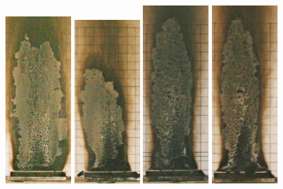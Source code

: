\documentclass[twoside]{uocthesis}
\begin{document}
{\begin{figure}[p]
	\includegraphics[width=1.0in]{../Figures/GBGAS_23_IMG_6048}
	\includegraphics[width=1.0in]{../Figures/GBGAS_26_IMG_6192}
	\includegraphics[width=1.0in]{../Figures/GBGAS_27_IMG_6210}
	\includegraphics[width=1.0in]{../Figures/GBGAS_28_IMG_6230}

\end{figure}}
\end{document}
